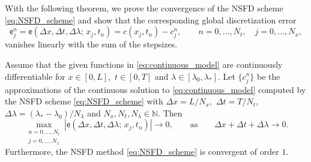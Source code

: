 \documentclass[a4paper, UKenglish, numberwithinsect, thm-restate]{tgdk-v2021}
\begin{document}
With the following theorem, we prove the convergence of the NSFD scheme \eqref{eq:NSFD_scheme} and show that the corresponding global discretization error
\begin{equation}\label{eq:global_error}
   \mathsf{e}_j^n=\mathsf{e}(\Delta x, \Delta t, \Delta \lambda; \,  x_j,t_n)=c(x_j,t_n)-c_j^n,    \qquad n=0,\dots, N_t, \quad j=0,\dots, N_x,
\end{equation}
vanishes linearly with the sum of the stepsizes. 
\begin{theorem}\label{thm:NSFD_conv} 
    Assume that the given functions in \eqref{eq:continuous_model} are continuously differentiable for $x\in [0,L],$ $t \in [0,T]$ and $\lambda \in [\lambda_{0},\lambda_{*}].$ Let $\{c^n_j\}$ be the approximations of the continuous solution to \eqref{eq:continuous_model} computed by the NSFD scheme \eqref{eq:NSFD_scheme} with $\Delta x=L/N_x,$ $\Delta t=T/N_t,$ $\Delta \lambda=(\lambda_{*}-\lambda_{0})/N_\lambda$ and $N_x,N_t,N_\lambda\in \mathbb{N}.$ Then
    \begin{equation*}
        \max_{\substack{n=0,\dots, N_t \\ j=0,\dots, N_x}}|\mathsf{e}(\Delta x, \Delta t, \Delta \lambda; \,  x_j,t_n)|\longrightarrow 0, \qquad \text{as} \qquad \Delta x+\Delta t+\Delta \lambda \to 0.
    \end{equation*}
    Furthermore, the NSFD method \eqref{eq:NSFD_scheme} is convergent of order $1.$
\end{theorem}
\end{document}

